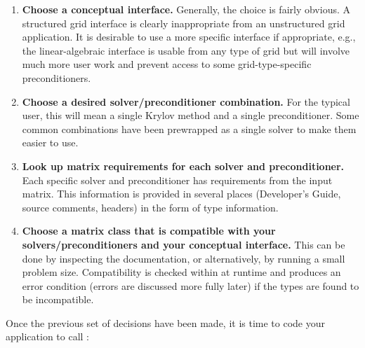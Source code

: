 \begin{enumerate}

\item
{\bf Choose a conceptual interface.} Generally, the choice is fairly obvious.
A structured grid 
interface is clearly inappropriate from an unstructured grid application. It is
desirable to use a more 
specific interface if appropriate, e.g., the linear-algebraic interface is
usable from any type of grid but 
will involve much more user work and prevent access to some grid-type-specific
preconditioners.

\item 
{\bf Choose a desired solver/preconditioner combination.} For the typical user,
this will mean a single 
Krylov method and a single preconditioner. Some common combinations have been
prewrapped as a 
single solver to make them easier to use. 

\item 
{\bf Look up matrix requirements for each solver and preconditioner.} Each
specific solver and 
preconditioner has requirements from the input matrix. This 
information is provided in several places (Developer's Guide, source comments,
headers) in the form 
of type information.

\item 
{\bf Choose a matrix class that is compatible with your solvers/preconditioners and your
conceptual 
interface.} This can be done by inspecting the documentation, or alternatively,
by running a small 
problem size.
Compatibility is checked within \hypre{} at runtime and produces
an error condition 
(errors are discussed more fully later) if the types are found to be
incompatible.

\end{enumerate}

Once the previous set of decisions have been made, it is time to code your application 
to call \hypre{}:

